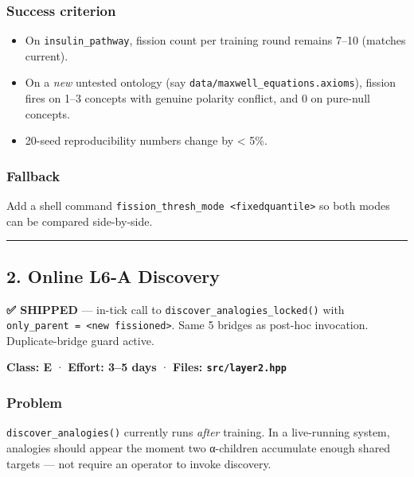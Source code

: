 \documentclass[
  11pt,
  a4paper,
]{article}
\providecommand{\tightlist}{%
  \setlength{\itemsep}{0pt}\setlength{\parskip}{0pt}}
\begin{document}
\subsubsection{Success criterion}\label{success-criterion}

\begin{itemize}
\tightlist
\item
  On \texttt{insulin\_pathway}, fission count per training round remains
  7--10 (matches current).
\item
  On a \emph{new} untested ontology (say
  \texttt{data/maxwell\_equations.axioms}), fission fires on 1--3
  concepts with genuine polarity conflict, and 0 on pure-null concepts.
\item
  20-seed reproducibility numbers change by \textless{} 5\%.
\end{itemize}

\subsubsection{Fallback}\label{fallback}

Add a shell command
\texttt{fission\_thresh\_mode\ \textless{}fixed\textbar{}quantile\textgreater{}}
so both modes can be compared side-by-side.

\begin{center}\rule{0.5\linewidth}{0.5pt}\end{center}

\subsection{2. Online L6-A Discovery}\label{online-l6-a-discovery}

\textbf{✅ SHIPPED} --- in-tick call to
\texttt{discover\_analogies\_locked()} with
\texttt{only\_parent\ =\ \textless{}new\ fissioned\textgreater{}}. Same
5 bridges as post-hoc invocation. Duplicate-bridge guard active.

\textbf{Class: E} · \textbf{Effort: 3--5 days} · \textbf{Files:
\texttt{src/layer2.hpp}}

\subsubsection{Problem}\label{problem-1}

\texttt{discover\_analogies()} currently runs \emph{after} training. In
a live-running system, analogies should appear the moment two α-children
accumulate enough shared targets --- not require an operator to invoke
discovery.
\end{document}
